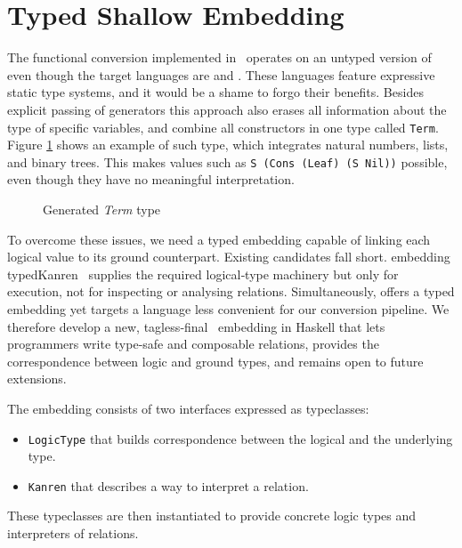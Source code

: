 \section{Typed Shallow Embedding}
\label{contrib:tagless}

The functional conversion implemented in~\cite{engel2023translation} operates on an untyped version of \mk even though the target languages are \haskell and \ocaml. 
These languages feature expressive static type systems, and it would be a shame to forgo their benefits. 
Besides explicit passing of generators this approach also erases all information about the type of specific variables, and combine all constructors in one type called \lstinline{Term}. 
Figure \ref{fig:generatedterm} shows an example of such type, which integrates natural numbers, lists, and binary trees.
This makes values such as \lstinline{S (Cons (Leaf) (S Nil))} possible, even though they have no meaningful interpretation.  

\begin{figure}[h]
    \centering
    \caption{Generated \emph{Term} type}
    \label{fig:generatedterm}
\end{figure}

To overcome these issues, we need a typed \mk embedding capable of linking each logical value to its ground counterpart. 
Existing candidates fall short.
\haskell embedding typedKanren~\cite{kudasov2024typedkanren} supplies the required logical‑type machinery but only for execution, not for inspecting or analysing relations. 
Simultaneously, \ocanren offers a typed \ocaml embedding yet targets a language less convenient for our conversion pipeline. 
We therefore develop a new, tagless‑final~\cite{carette2009finally} embedding in Haskell that lets programmers write type‑safe and composable relations, provides the correspondence between logic and ground types, and remains open to future extensions. 

The embedding consists of two interfaces expressed as \haskell typeclasses:  

\begin{itemize}
    \item \lstinline{LogicType} that builds correspondence between the logical and the underlying type.
    \item \lstinline{Kanren} that describes a way to interpret a \mk relation. 
\end{itemize}    

These typeclasses are then instantiated to provide concrete logic types and interpreters of relations. 

